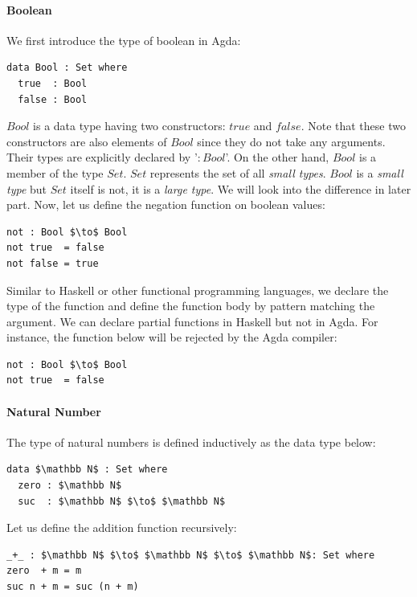 \documentclass[twoside,openright,final]{bhamthesis}
\begin{document}
\paragraph{Boolean} We first introduce the type of boolean in Agda: 
\begin{lstlisting}[mathescape=true,xleftmargin=.3\textwidth]
data Bool : Set where
  true  : Bool
  false : Bool
\end{lstlisting}
\par \(Bool\) is a data type having two
constructors: \(true\) and \(false\). Note that these two constructors
are also elements of \(Bool\) since they do not take any
arguments. Their types are explicitly declared by '\(:
Bool\)'. On the other hand, \(Bool\) is a member of the type \(Set\). \(Set\)
represents the set of all \textit{small types}. \(Bool\) is a
\textit{small type} but \(Set\) itself is not, it is a \textit{large
  type}. We will look into the difference in later
part. Now, let us define the negation function on boolean values:
\begin{lstlisting}[mathescape=true,xleftmargin=.3\textwidth]
not : Bool $\to$ Bool
not true  = false
not false = true
\end{lstlisting}
\par Similar to Haskell or other functional programming languages, we
declare the type of the function and define the function body by
pattern matching the argument. We can declare partial
functions in Haskell but not in Agda. For instance, the function below
will be rejected by the Agda compiler:
\begin{lstlisting}[mathescape=true,xleftmargin=.3\textwidth]
not : Bool $\to$ Bool
not true  = false
\end{lstlisting}

\paragraph{Natural Number} The type of natural numbers is defined inductively as
the data type below: 
\begin{lstlisting}[mathescape=true,xleftmargin=.3\textwidth]
data $\mathbb N$ : Set where
  zero : $\mathbb N$
  suc  : $\mathbb N$ $\to$ $\mathbb N$
\end{lstlisting} 
\par Let us define the addition function recursively:
\begin{lstlisting}[mathescape=true,xleftmargin=.3\textwidth]
_+_ : $\mathbb N$ $\to$ $\mathbb N$ $\to$ $\mathbb N$: Set where
zero  + m = m
suc n + m = suc (n + m)
\end{lstlisting} 
\end{document}
